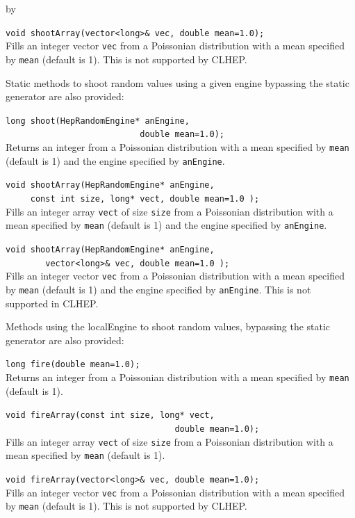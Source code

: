 \documentclass[twoside]{article}
\newcommand{\comp}[1]{\texttt{#1}}%
\newcommand{\entrylabel}[1]{\mbox{\textbf{{#1}}}\hfil}%
\newenvironment{entry}
{\begin{list}{}%
    {\renewcommand{\makelabel}{\entrylabel}%
     \setlength{\labelwidth}{90pt}%
     \setlength{\leftmargin}{\labelwidth}
     \advance\leftmargin by \labelsep%
      }%
    }%
  {\end{list}}
\newcommand{\Entrylabel}[1]%
{\raisebox{0pt}[1ex][0pt]{\makebox[\labelwidth][l]%
    {\parbox[t]{\labelwidth}{\hspace{0pt}\textbf{{#1}}}}}}
\newenvironment{Entry}%
{\renewcommand{\entrylabel}{\Entrylabel}\begin{entry}}%
  {\end{entry}}
\begin{document}
\begin{description}
\begin{Entry}
    \verb+void shootArray(vector<long>& vec, double mean=1.0);+\\
    Fills an integer vector \comp{vec} from a
    Poissonian distribution with a mean specified by \comp{mean}
    (default is 1).  This is not supported by CLHEP.

    Static methods to shoot random values using a given engine
    bypassing the static generator are also provided:

    \verb+long shoot(HepRandomEngine* anEngine,+\\
    \verb+                           double mean=1.0);+\\
    Returns an integer from a Poissonian distribution with a mean
    specified by \comp{mean} (default is 1) and the engine specified
    by \comp{anEngine}.
  
    \verb+void shootArray(HepRandomEngine* anEngine,+\\
    \verb+     const int size, long* vect, double mean=1.0 );+\\
    Fills an integer array \comp{vect} of size \comp{size} from a
    Poissonian distribution with a mean specified by \comp{mean}
    (default is 1) and the engine specified by \comp{anEngine}.

    \verb+void shootArray(HepRandomEngine* anEngine,+\\
    \verb+        vector<long>& vec, double mean=1.0 );+\\
    Fills an integer vector \comp{vec} from a
    Poissonian distribution with a mean specified by \comp{mean}
    (default is 1) and the engine specified by \comp{anEngine}.
    This is not supported in CLHEP.
    
    Methods using the localEngine to shoot random values, bypassing
    the static generator are also provided:

    \verb+long fire(double mean=1.0);+\\
    Returns an integer from a Poissonian distribution with a mean
    specified by \comp{mean} (default is 1).
  
    \verb+void fireArray(const int size, long* vect,+\\
    \verb+                                  double mean=1.0);+\\
    Fills an integer array \comp{vect} of size \comp{size} from a
    Poissonian distribution with a mean specified by \comp{mean}
    (default is 1).

    \verb+void fireArray(vector<long>& vec, double mean=1.0);+\\
    Fills an integer vector \comp{vec} from a
    Poissonian distribution with a mean specified by \comp{mean}
    (default is 1).  This is not supported by CLHEP.
  

\end{Entry}
\end{description}
\end{document}
